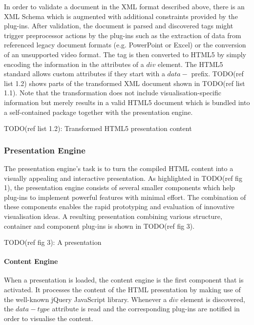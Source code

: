\documentclass[a4paper,12pt]{report}
\begin{document}
     In order to validate a \mxp document in the XML format described above,
     there is an XML Schema which is augmented with additional constraints
     provided by the plug-ins. After validation, the document is parsed and
     discovered tags might trigger preprocessor actions by the plug-ins such as
     the extraction of data from referenced legacy document formats (e.g.
     PowerPoint or Excel) or the conversion of an unsupported video format. The
     tag is then converted to HTML5 by simply encoding the information in the
     attributes of a $div$ element. The HTML5 standard allows custom attributes
     if they start with a $data-$ prefix. TODO(ref list 1.2) shows parts of the
     transformed XML document shown in TODO(ref list 1.1). Note that the
     transformation does not include visualisation-specific information but
     merely results in a valid HTML5 document which is bundled into a
     self-contained package together with the presentation engine.

     TODO(ref list 1.2): Transformed HTML5 presentation content

    \subsubsection{Presentation Engine}

     The presentation engine's task is to turn the compiled HTML content into a
     visually appealing and interactive presentation. As highlighted in
     TODO(ref fig 1), the presentation engine consists of several smaller
     components which help plug-ins to implement powerful features with minimal
     effort. The combination of these components enables the rapid prototyping
     and evaluation of innovative visualisation ideas. A resulting \mxp
     presentation combining various structure, container and component plug-ins
     is shown in TODO(ref fig 3).

     TODO(ref fig 3): A \mxp presentation

     \paragraph{Content Engine} When a presentation is loaded, the content
      engine is the first component that is activated. It processes the content
      of the HTML presentation by making use of the well-known jQuery
      JavaScript library. Whenever a $div$ element is discovered, the
      $data-type$ attribute is read and the corresponding plug-ins are notified
      in order to visualise the content.
\end{document}
